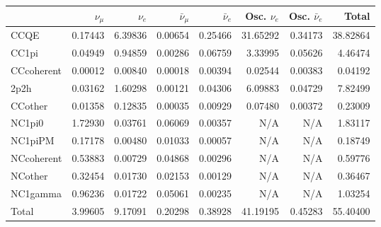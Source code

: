 \begin{tabular} { | l ||r | r | r | r | r | r | | r | }
\hline
              & $\nu_\mu$            & $\nu_e$              & $\bar{\nu}_{\mu}$    & $\bar{\nu}_{e}$      & Osc. $\nu_e$         & Osc. $\bar{\nu}_{e}$ & Total                \\ \hline\hline
 CCQE         & 0.17443              & 6.39836              & 0.00654              & 0.25466              & 31.65292             & 0.34173              & 38.82864             \\ \hline
 CC1pi        & 0.04949              & 0.94859              & 0.00286              & 0.06759              & 3.33995              & 0.05626              & 4.46474              \\ \hline
 CCcoherent   & 0.00012              & 0.00840              & 0.00018              & 0.00394              & 0.02544              & 0.00383              & 0.04192              \\ \hline
 2p2h         & 0.03162              & 1.60298              & 0.00121              & 0.04306              & 6.09883              & 0.04729              & 7.82499              \\ \hline
 CCother      & 0.01358              & 0.12835              & 0.00035              & 0.00929              & 0.07480              & 0.00372              & 0.23009              \\ \hline
 NC1pi0       & 1.72930              & 0.03761              & 0.06069              & 0.00357              & N/A                  & N/A                  & 1.83117              \\ \hline
 NC1piPM      & 0.17178              & 0.00480              & 0.01033              & 0.00057              & N/A                  & N/A                  & 0.18749              \\ \hline
 NCcoherent   & 0.53883              & 0.00729              & 0.04868              & 0.00296              & N/A                  & N/A                  & 0.59776              \\ \hline
 NCother      & 0.32454              & 0.01730              & 0.02153              & 0.00129              & N/A                  & N/A                  & 0.36467              \\ \hline
 NC1gamma     & 0.96236              & 0.01722              & 0.05061              & 0.00235              & N/A                  & N/A                  & 1.03254              \\ \hline
\hline
 Total        & 3.99605              & 9.17091              & 0.20298              & 0.38928              & 41.19195             & 0.45283              & 55.40400             \\ \hline

\end{tabular}
